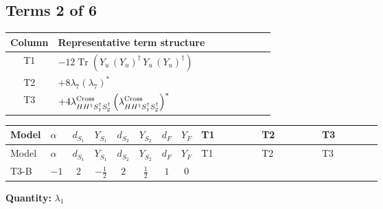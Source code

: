 \documentclass[8pt]{article}
\begin{document}
\begin{landscape}
\subsection*{Terms 2 of 6}
\begin{center}
\begin{tabular}{@{}c >{\raggedright\arraybackslash}p{0.82\linewidth}@{}}
\toprule
Column & Representative term structure \\
\midrule
T1 & \(\displaystyle -12 \operatorname{Tr}\!\left({Y_u}\,\left({Y_u}\right)^{\dagger}\,{Y_u}\,\left({Y_u}\right)^{\dagger}\right)\) \\
\midrule
T2 & \(\displaystyle +8 {\lambda_{7}} \left({\lambda_{7}}\right)^{*}\) \\
\midrule
T3 & \(\displaystyle +4 {\lambda_{H H^\dagger S_1^\dagger S_2^\dagger}^{\rm Cross}} \left({\lambda_{H H^\dagger S_1^\dagger S_2^\dagger}^{\rm Cross}}\right)^{*}\) \\
\midrule
\bottomrule
\end{tabular}
\end{center}
\smallskip
\tiny
\begin{longtable}{@{}llcccccc >{\raggedright\arraybackslash}p{0.21\linewidth} >{\raggedright\arraybackslash}p{0.21\linewidth} >{\raggedright\arraybackslash}p{0.21\linewidth}@{}}
\toprule
Model & $\alpha$ & $d_{S_1}$ & $Y_{S_1}$ & $d_{S_2}$ & $Y_{S_2}$ & $d_F$ & $Y_F$ & T1 & T2 & T3 \\
\midrule
\endfirsthead
\toprule
Model & $\alpha$ & $d_{S_1}$ & $Y_{S_1}$ & $d_{S_2}$ & $Y_{S_2}$ & $d_F$ & $Y_F$ & T1 & T2 & T3 \\
\midrule
\endhead
T3-B & $-1$ & $2$ & $-\frac{1}{2}$ & $2$ & $\frac{1}{2}$ & $1$ & $0$ & \scriptsize\adjustbox{max width=\linewidth}{$\begin{gathered} -12 \operatorname{Tr}\!\left({Y_u}\,\left({Y_u}\right)^{\dagger}\,{Y_u}\,\left({Y_u}\right)^{\dagger}\right)\end{gathered}$} & \scriptsize\adjustbox{max width=\linewidth}{$\begin{gathered} +8 {\lambda_{7}} \left({\lambda_{7}}\right)^{*}\end{gathered}$} & \scriptsize\adjustbox{max width=\linewidth}{$\begin{gathered} +4 {\lambda_{H H^\dagger S_1^\dagger S_2^\dagger}^{\rm Cross}} \left({\lambda_{H H^\dagger S_1^\dagger S_2^\dagger}^{\rm Cross}}\right)^{*}\end{gathered}$} \\
\midrule
\bottomrule
\end{longtable}
\clearpage
\noindent\textbf{Quantity: }$\lambda_1$\par\smallskip

\end{landscape}
\end{document}
